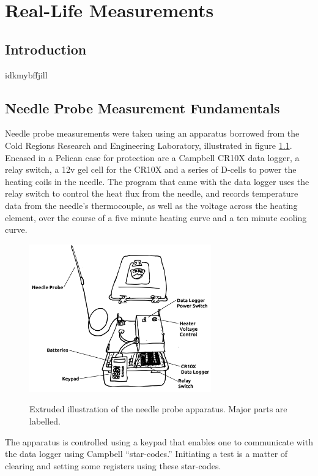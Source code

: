 \chapter{Real-Life Measurements}

\section{Introduction}

idkmybffjill

\section{Needle Probe Measurement Fundamentals}

Needle probe measurements were taken using an apparatus borrowed from the Cold
Regions Research and Engineering Laboratory, illustrated in figure
\ref{fig:apparatus}. Encased in a Pelican case for protection are a Campbell
CR10X data logger, a relay switch, a 12v gel cell for the CR10X and a series of
D-cells to power the heating coils in the needle. The program that came with the
data logger uses the relay switch to control the heat flux from the needle, and
records temperature data from the needle's thermocouple, as well as the voltage
across the heating element, over the course of a five minute heating curve and
a ten minute cooling curve.

\begin{figure}[h]
\centering
\includegraphics[width=0.7\textwidth]{fig/apparatus.png}
\label{fig:apparatus}
\caption{Extruded illustration of the needle probe apparatus. Major parts are labelled.}
\end{figure}

The apparatus is controlled using a keypad that enables one to communicate
with the data logger using Campbell ``star-codes.'' Initiating a test is a
matter of clearing and setting some registers using these star-codes.

